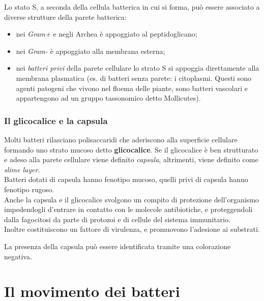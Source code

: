 \documentclass[11pt]{book}
\begin{document}
\vspace{1em}
Lo stato S, a seconda della cellula batterica in cui si forma, può essere associato a diverse strutture della parete batterica:
\begin{itemize}
\item nei \emph{Gram+} e negli Archea è appoggiato al peptidoglicano;
\item nei \emph{Gram-} è appoggiato alla membrana esterna;
\item nei \emph{batteri privi} della parete cellulare lo strato S si appoggia direttamente alla membrana plasmatica (es. di batteri senza parete: i citoplasmi. Questi sono agenti patogeni che vivono nel floema delle piante, sono batteri vascolari e appartengono ad un gruppo tassonomico detto Mollicutes).
\end{itemize}
 
\subsection{Il glicocalice e la capsula}

Molti batteri rilasciano polisaccaridi che aderiscono alla superficie cellulare formando uno strato mucoso detto \textbf{glicocalice}. 
Se il glicocalice è ben strutturato e adeso alla parete cellulare viene definito \emph{capsula}, altrimenti, viene definito come \emph{slime layer}.\\ 
Batteri dotati di capsula hanno fenotipo mucoso, quelli privi di capsula hanno fenotipo rugoso.\\
Anche la capsula e il glicocalice svolgono un compito di protezione dell’organismo impedendogli d’entrare in contatto con le molecole antibiotiche, e proteggendoli dalla fagocitosi da parte di protozoi e di cellule del sistema immunitario.\\
Inoltre costituiscono un fattore di virulenza, e promuovono l’adesione ai substrati.

\vspace{1em}
La presenza della capsula può essere identificata tramite una colorazione negativa.

\chapter{Il movimento dei batteri}
\end{document}
